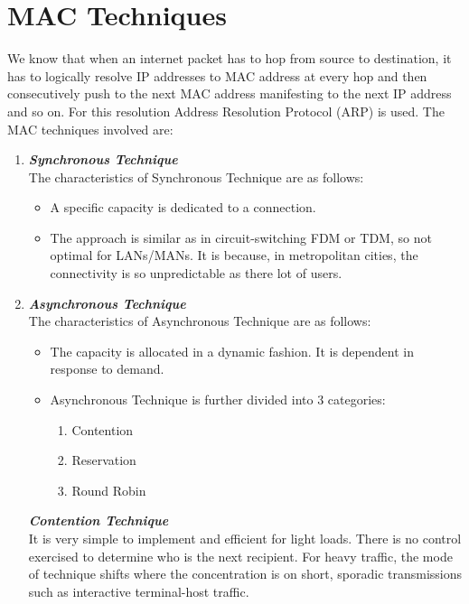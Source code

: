 \documentclass[12pt]{article}
\begin{document}
\section{MAC Techniques}
We know that when an internet packet has to hop from source to destination, it has to logically resolve IP addresses to MAC address at every hop and then consecutively push to the next MAC address manifesting to the next IP address and so on. For this resolution Address Resolution Protocol (ARP) is used. The MAC techniques involved are:
\begin{enumerate}[label=(\alph*)]
    \item \textbf{\textit{Synchronous Technique}} \\
    The characteristics of Synchronous Technique are as follows:
        \begin{itemize}
            \item A specific capacity is dedicated to a connection.
            \item The approach is similar as in circuit-switching FDM or TDM, so not optimal for LANs/MANs. It is because, in metropolitan cities, the connectivity is so unpredictable as there lot of users.
        \end{itemize}
    \item \textbf{\textit{Asynchronous Technique}} \\
    The characteristics of Asynchronous Technique are as follows:
        \begin{itemize}
            \item The capacity is allocated in a dynamic fashion. It is dependent in response to demand.
            \item Asynchronous Technique is further divided into 3 categories:
                \begin{enumerate}
                    \item Contention
                    \item Reservation
                    \item Round Robin
                \end{enumerate}
        \end{itemize}
    
    \textbf{\textit{Contention Technique}} \\
    It is very simple to implement and efficient for light loads. There is no control exercised to determine who is the next recipient. For heavy traffic, the mode of technique shifts where the concentration is on short, sporadic transmissions such as interactive terminal-host traffic.
    

\end{enumerate}
\end{document}
